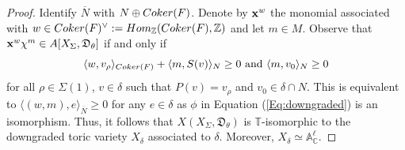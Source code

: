 \documentclass[11pt, reqno]{amsart}
\theoremstyle{plain}
\theoremstyle{definition}
\theoremstyle{remark}
\begin{document}
\begin{proof}
 Identify $\overline{N}$ with $ N\oplus {\rm Coker}(F)$.
Denote by ${\bf x}^{w}$ the monomial associated with $w\in {\rm Coker}(F)^{\vee}:= {\rm Hom}_{\mathbb{Z}}({\rm Coker}(F), \mathbb{Z})$ and  let $m\in M$. Observe that  ${\bf x}^{w}\chi^{m}\in A[X_{\Sigma}, \mathfrak{D}_{\theta}]$ if and only if 
$$\langle w, v_{\rho} \rangle_{{\rm Coker}(F)}  + \langle m, S(v)\rangle_{N}\geq 0\text{ and }\langle m, v_{0}\rangle_{N}\geq 0$$
for all  $\rho\in\Sigma(1)$, $v\in\delta$ such that $P(v)  =  v_{\rho}$ and $v_{0}\in\delta\cap N$. This is equivalent to  $\langle (w, m), e \rangle_{\overline{N}}\geq 0$ for any $e\in \delta$ as $\phi$ in Equation (\ref{Eq:downgraded}) is an isomorphism. Thus, it follows that $X(X_{\Sigma}, \mathfrak{D}_{\theta})$ is $\mathbb{T}$-isomorphic to the downgraded toric variety $X_{\delta}$ associated to $\delta$. Moreover, $X_{\delta} \simeq \mathbb{A}_{\mathbb{C}}^{\ell}$.


\end{proof}
\end{document}

